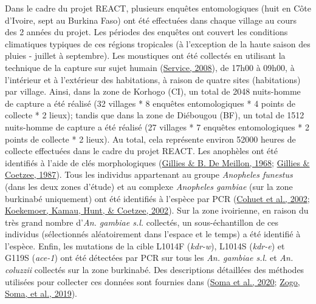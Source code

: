 \documentclass[12pt,twoside]{reedthesis}
\begin{document}
Dans le cadre du projet REACT, plusieurs enquêtes entomologiques (huit en Côte d'Ivoire, sept au Burkina Faso) ont été effectuées dans chaque village au cours des 2 années du projet. Les périodes des enquêtes ont couvert les conditions climatiques typiques de ces régions tropicales (à l'exception de la haute saison des pluies - juillet à septembre). Les moustiques ont été collectés en utilisant la technique de la capture sur sujet humain (\protect\hyperlink{ref-Silver2008}{Service, 2008}), de 17h00 à 09h00, à l'intérieur et à l'extérieur des habitations, à raison de quatre sites (habitations) par village. Ainsi, dans la zone de Korhogo (CI), un total de 2048 nuits-homme de capture a été réalisé (32 villages * 8 enquêtes entomologiques * 4 points de collecte * 2 lieux); tandis que dans la zone de Diébougou (BF), un total de 1512 nuits-homme de capture a été réalisé (27 villages * 7 enquêtes entomologiques * 2 points de collecte * 2 lieux). Au total, cela représente environ 52000 heures de collecte effectuées dans le cadre du projet REACT. Les anophèles ont été identifiés à l'aide de clés morphologiques (\protect\hyperlink{ref-gillies_anophelinae_1968}{Gillies \& B. De Meillon, 1968}; \protect\hyperlink{ref-gillies_supplement_1987}{Gillies \& Coetzee, 1987}). Tous les individus appartenant au groupe \emph{Anopheles funestus} (dans les deux zones d'étude) et au complexe \emph{Anopheles gambiae} (sur la zone burkinabé uniquement) ont été identifiés à l'espèce par PCR (\protect\hyperlink{ref-cohuet_isolation_2002}{Cohuet et al., 2002}; \protect\hyperlink{ref-koekemoer_cocktail_2002}{Koekemoer, Kamau, Hunt, \& Coetzee, 2002}). Sur la zone ivoirienne, en raison du très grand nombre d'\emph{An. gambiae s.l.} collectés, un sous-échantillon de ces individus (sélectionnés aléatoirement dans l'espace et le temps) a été identifié à l'espèce. Enfin, les mutations de la cible L1014F (\emph{kdr-w}), L1014S (\emph{kdr-e}) et G119S (\emph{ace-1}) ont été détectées par PCR sur tous les \emph{An. gambiae s.l.} et \emph{An. coluzzii} collectés sur la zone burkinabé. Des descriptions détaillées des méthodes utilisées pour collecter ces données sont fournies dans (\protect\hyperlink{ref-soma_anopheles_2020}{Soma et al., 2020}; \protect\hyperlink{ref-zogo_anopheles_2019}{Zogo, Soma, et al., 2019}).\\
\end{document}
